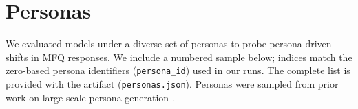 \documentclass{article}
\begin{document}
\section{Personas}
\label{app:personas}
We evaluated models under a diverse set of personas to probe persona-driven shifts in MFQ responses. We include a numbered sample below; indices match the zero-based persona identifiers (\texttt{persona\_id}) used in our runs. The complete list is provided with the artifact (\texttt{personas.json}). Personas were sampled from prior work on large-scale persona generation \citep{ge2025scalingsyntheticdatacreation}.

\end{document}
